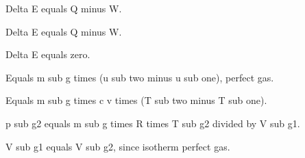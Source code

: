 Delta E equals Q minus W.

Delta E equals Q minus W.

Delta E equals zero.

Equals m sub g times (u sub two minus u sub one), perfect gas.

Equals m sub g times c v times (T sub two minus T sub one).

p sub g2 equals m sub g times R times T sub g2 divided by V sub g1.

V sub g1 equals V sub g2, since isotherm perfect gas.